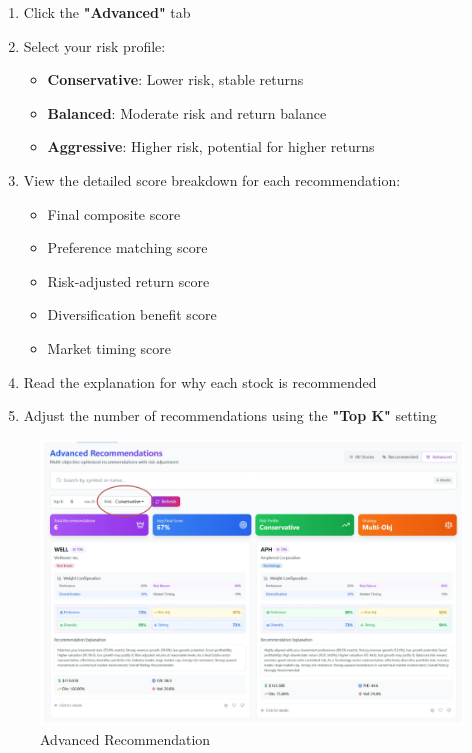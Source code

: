 \begin{enumerate}
    \item Click the \textbf{"Advanced"} tab
    \item Select your risk profile:
    \begin{itemize}
        \item \textbf{Conservative}: Lower risk, stable returns
        \item \textbf{Balanced}: Moderate risk and return balance
        \item \textbf{Aggressive}: Higher risk, potential for higher returns
    \end{itemize}
    \item View the detailed score breakdown for each recommendation:
    \begin{itemize}
        \item Final composite score
        \item Preference matching score
        \item Risk-adjusted return score
        \item Diversification benefit score
        \item Market timing score
    \end{itemize}
    \item Read the explanation for why each stock is recommended
    \item Adjust the number of recommendations using the \textbf{"Top K"} setting
\end{enumerate}

\begin{figure}[H]
    \centering
    \includegraphics[width=1\linewidth]{images/stock_recommend/user_guide/advanced_recommend.png}
    \caption{Advanced Recommendation}
    \label{fig:advanced_recommend}
\end{figure}


